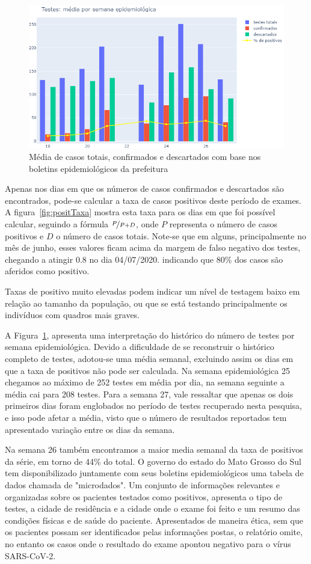 \documentclass[12pt]{article}
\begin{document}
\begin{figure}[!htb]
  \centering
  \includegraphics[width=.75\textwidth]{figs/media_cof_desc.png}
  \caption{Média de casos totais, confirmados e descartados com base nos boletins epidemiológicos da prefeitura}
  \label{fig:medTeste}
  \end{figure}

Apenas nos dias em que os números de casos confirmados e descartados são encontrados, pode-se calcular a taxa de casos positivos deste período de exames. A figura~\ref{fig:positTaxa} mostra esta taxa para os dias em que foi possível calcular, seguindo a fórmula \( \nicefrac{P}{P+D}\), onde \(P\) representa o número de casos positivos e \(D\) o número de casos totais. Note-se que em alguns, principalmente no mês de junho, esses valores ficam acima da margem de falso negativo dos testes, chegando a atingir \(0.8\) no dia 04/07/2020. indicando que 80\% dos casos são aferidos como positivo.

Taxas de positivo muito elevadas podem indicar um nível de testagem baixo em relação ao tamanho da população, ou que se está testando principalmente os indivíduos com quadros mais graves.

A Figura~\ref{fig:medTeste}, apresenta uma interpretação do histórico do número de testes por semana epidemiológica. Devido a dificuldade de se reconstruir o histórico completo de testes, adotou-se uma média semanal, excluindo assim os dias em que a taxa de positivos não pode ser calculada. Na semana epidemiológica 25 chegamos ao máximo de 252 testes em média por dia, na semana seguinte a média cai para 208 testes. Para a semana 27, vale ressaltar que apenas os dois primeiros dias foram englobados no período de testes recuperado nesta pesquisa, e isso pode afetar a média, visto que o número de resultados reportados tem apresentado variação entre os dias da semana.

Na semana 26 também encontramos a maior media semanal da taxa de positivos da série, em torno de 44\% do total. O governo do estado do Mato Grosso do Sul tem disponibilizado juntamente com seus boletins epidemiológicos \cite{BoletinsMS} uma tabela de dados chamada de "microdados". Um conjunto de informações relevantes e organizadas sobre os pacientes testados como positivos, apresenta o tipo de testes, a cidade de residência e a cidade onde o exame foi feito e um resumo das condições físicas e de saúde do paciente. Apresentados de maneira ética, sem que os pacientes possam ser identificados pelas informações postas, o relatório omite, no entanto os casos onde o resultado do exame apontou negativo para o vírus SARS-CoV-2.
\end{document}
